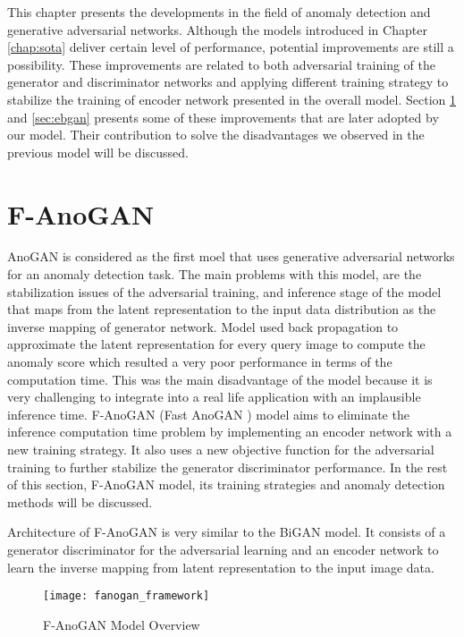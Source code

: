 
\begingroup

\begingroup
{
	\color{Green}

This chapter presents the developments in the field of anomaly detection and generative adversarial
networks. Although the models introduced in Chapter \ref{chap:sota} deliver certain level of
performance, potential improvements are still a possibility. These improvements are related to both
adversarial training of the generator and discriminator networks and applying different training strategy to 
stabilize the training of encoder network presented in the overall model. Section \ref{sec:fanogan} and 
\ref{sec:ebgan} presents some of these improvements that are later adopted by our model. Their contribution
to solve the disadvantages we observed in the previous model will be discussed. 

\section{F-AnoGAN }
\label{sec:fanogan}

AnoGAN \cite{Schlegl2017UnsupervisedAD} is considered as the first moel that uses generative
adversarial networks for an anomaly detection task. The main problems with this model, are the
stabilization issues of the adversarial training, and inference stage of the model that
maps from the latent representation to the input data distribution
as the inverse mapping of generator network. Model used back propagation to approximate the latent
representation for every query image to compute the anomaly score which resulted a very poor
performance in terms of the computation time. This was the main disadvantage of the model
because it is very challenging to integrate into a real life application with an implausible
inference time. F-AnoGAN (Fast AnoGAN ) model \cite{pub.1111824956} aims to eliminate the inference computation time 
problem by implementing an encoder network with a new training strategy. It also uses a new objective function for the adversarial
training to further stabilize the generator discriminator performance. In the rest of this section,
F-AnoGAN model, its training strategies and anomaly detection methods will be discussed.

Architecture of F-AnoGAN is very similar to the BiGAN \cite{Donahue2017AdversarialFL}
model. It consists of a generator discriminator for the adversarial learning and an encoder
network to learn the inverse mapping from latent representation to the input image data.
\begin{figure}[h!]
	\centering
	\texttt{[image: fanogan\_framework]}
	\caption{F-AnoGAN Model Overview \cite{pub.1111824956}}
	\label{fig:fanogan_network}
\end{figure}

}
